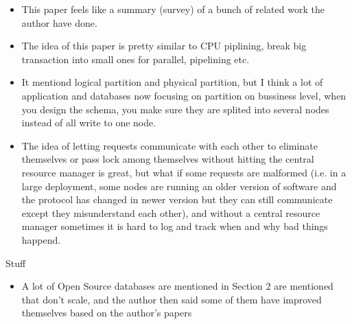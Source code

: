 \documentclass[12pt,a4paper,oneside]{article}
\begin{document}
\begin{itemize}
  \item This paper feels like a summary (survey) of a bunch of related work the author have done.
  \item The idea of this paper is pretty similar to CPU piplining, break big transaction into small ones for parallel,
  pipelining etc.
  \item It mentiond logical partition and physical partition, but I think a lot of application and databases now
  focusing on partition on bussiness level, when you design the schema, you make sure they are splited into several nodes
  instead of all write to one node.
  \item The idea of letting requests communicate with each other to eliminate themselves or pass lock among themselves without
  hitting the central resource manager is great, but what if some requests are malformed (i.e. in a large deployment,
  some nodes are running an older version of software and the protocol has changed in newer version but they can still communicate
  except they misunderstand each other), and without a central resource manager sometimes it is hard to log and track when and why bad things happend.
\end{itemize}

Stuff

\begin{itemize}
  \item  A lot of Open Source databases are mentioned in Section 2 are mentioned that don't scale, and the author then said
  some of them have improved themselves based on the author's papers
\end{itemize}
\end{document}
